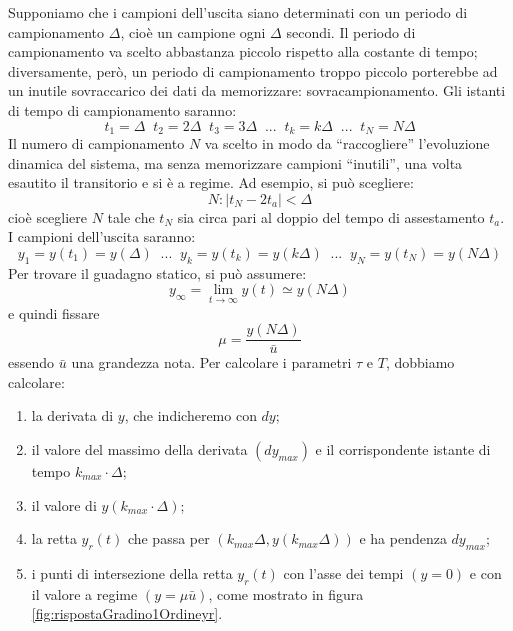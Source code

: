 \documentclass[a4paper]{report}
\begin{document}
Supponiamo che i campioni dell'uscita siano determinati con un periodo
di campionamento $\Delta$, cio\`e un campione ogni $\Delta$
secondi. Il periodo di campionamento va scelto abbastanza piccolo
rispetto alla costante di tempo; diversamente, per\`o, un periodo di
campionamento troppo piccolo porterebbe ad un inutile sovraccarico dei
dati da memorizzare: sovracampionamento. Gli istanti di tempo di
campionamento saranno: 
\[
t_1 = \Delta \;\; t_2 = 2\Delta \;\; t_3 = 3\Delta \;\; ... \;\; t_k =
k\Delta \;\; ... \;\; t_N = N\Delta
\]
Il numero di campionamento $N$ va scelto in modo da ``raccogliere''
l'evoluzione dinamica del sistema, ma senza memorizzare campioni
``inutili'', una volta esautito il transitorio e si \`e a regime. Ad
esempio, si pu\`o scegliere:
\[
N : |t_N - 2 t_a| < \Delta
\]
cio\`e scegliere $N$ tale che $t_N$ sia circa pari al doppio del tempo
di assestamento $t_a$. I campioni dell'uscita saranno:
\[
y_1 = y(t_1) = y (\Delta) \;\; ... \;\; y_k = y(t_k) = y(k\Delta) \;\;
... \;\; y_N = y(t_N) = y(N\Delta)
\]
Per trovare il guadagno statico, si pu\`o assumere:
\[
y_{\infty} = \lim_{t \to \infty} y(t) \simeq y(N\Delta)
\]
e quindi fissare
\[
\mu = \dfrac{y(N\Delta)}{\bar{u}}
\]
essendo $\bar{u}$ una grandezza nota. Per calcolare i parametri $\tau$
e $T$, dobbiamo calcolare:
\begin{enumerate}[label=\emph{\alph*})]
\item la derivata di $y$, che indicheremo con $dy$;
\item il valore del massimo della derivata $(dy_{max})$ e il
  corrispondente istante di tempo $k_{max} \cdot \Delta$;
\item il valore di $y(k_{max} \cdot \Delta)$;
\item la retta $y_r(t)$ che passa per $(k_{max}\Delta,
  y(k_{max}\Delta))$ e ha pendenza $dy_{max}$;
\item i punti di intersezione della retta $y_r(t)$ con l'asse dei
  tempi $(y = 0)$ e con il valore a regime $(y = \mu \bar{u})$, come
  mostrato in figura \ref{fig:rispostaGradino1Ordineyr}.
\end{enumerate}
\end{document}
